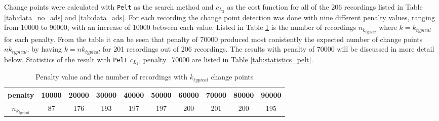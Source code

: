 Change points were calculated with \texttt{Pelt} as the search method and $c_{L_2}$ as the cost function for all of the 206 recordings listed in Table \ref{tab:data_no_ads} and \ref{tab:data_ads}. For each recording the change point detection was done with nine different penalty values, ranging from 10000 to 90000, with an increase of 10000 between each value. Listed in Table \ref{tab:penalty_k} is the number of recordings $n_{k_{typical}}$ where $k=k_{typical}$ for each penalty. From the table it can be seen that penalty of 70000 produced most conistently the expected number of change points $nk_{typical}$, by having $k=nk_{typical}$ for 201 recordings out of 206 recordings. The results with penalty of 70000 will be discussed in more detail below. Statistics of the result with \texttt{Pelt} $c_{L_2}$, penalty=70000 are listed in Table \ref{tab:statistics_pelt}.

\begin{table}[H]
    \begin{center}
    \begin{tabular}{|c|c|c|c|c|c|c|c|c|c|}
        \hline
        \textbf{penalty} & 10000 & 20000 & 30000 & 40000 & 50000 & 60000 & 70000 & 80000 & 90000 \\ \hline
        $n_{k_{typical}}$ & 87 & 176 & 193 & 197 & 197 & 200 & 201 & 200 & 195 \\ \hline
    \end{tabular}
    \end{center}
    \caption{Penalty value and the number of recordings with $k_{typical}$ change points}
    \label{tab:penalty_k}
\end{table}

